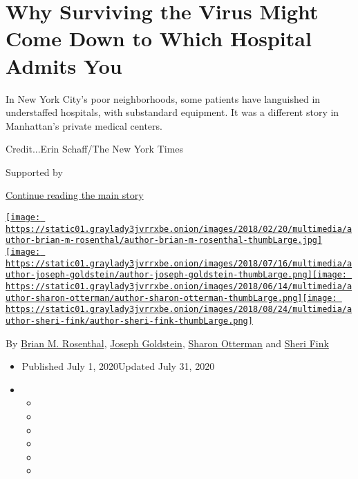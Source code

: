 \hypertarget{why-surviving-the-virus-might-come-down-to-which-hospital-admits-you}{%
\section{Why Surviving the Virus Might Come Down to Which Hospital
Admits
You}\label{why-surviving-the-virus-might-come-down-to-which-hospital-admits-you}}

In New York City's poor neighborhoods, some patients have languished in
understaffed hospitals, with substandard equipment. It was a different
story in Manhattan's private medical centers.

Credit...Erin Schaff/The New York Times

Supported by

\protect\hyperlink{after-sponsor}{Continue reading the main story}

\href{https://www.nytimes3xbfgragh.onion/by/brian-m-rosenthal}{\texttt{[image: https://static01.graylady3jvrrxbe.onion/images/2018/02/20/multimedia/author-brian-m-rosenthal/author-brian-m-rosenthal-thumbLarge.jpg]}}\href{https://www.nytimes3xbfgragh.onion/by/joseph-goldstein}{\texttt{[image: https://static01.graylady3jvrrxbe.onion/images/2018/07/16/multimedia/author-joseph-goldstein/author-joseph-goldstein-thumbLarge.png]}}\href{https://www.nytimes3xbfgragh.onion/by/sharon-otterman}{\texttt{[image: https://static01.graylady3jvrrxbe.onion/images/2018/06/14/multimedia/author-sharon-otterman/author-sharon-otterman-thumbLarge.png]}}\href{https://www.nytimes3xbfgragh.onion/by/sheri-fink}{\texttt{[image: https://static01.graylady3jvrrxbe.onion/images/2018/08/24/multimedia/author-sheri-fink/author-sheri-fink-thumbLarge.png]}}

By \href{https://www.nytimes3xbfgragh.onion/by/brian-m-rosenthal}{Brian
M. Rosenthal},
\href{https://www.nytimes3xbfgragh.onion/by/joseph-goldstein}{Joseph
Goldstein},
\href{https://www.nytimes3xbfgragh.onion/by/sharon-otterman}{Sharon
Otterman} and
\href{https://www.nytimes3xbfgragh.onion/by/sheri-fink}{Sheri Fink}

\begin{itemize}
\item
  Published July 1, 2020Updated July 31, 2020
\item
  \begin{itemize}
  \item
  \item
  \item
  \item
  \item
  \item
  \end{itemize}
\end{itemize}

